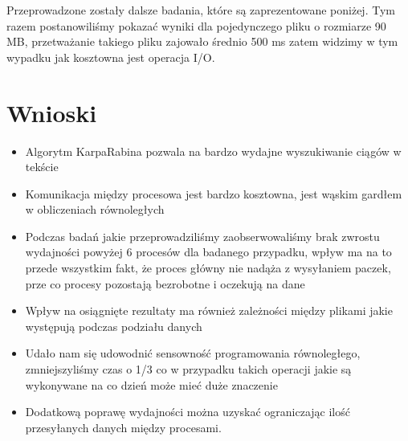 \documentclass[12pt,a4paper]{article}
\begin{document}
\newpage 
Przeprowadzone zostały dalsze badania, które są zaprezentowane poniżej. Tym razem postanowiliśmy pokazać wyniki dla pojedynczego pliku o rozmiarze 90 MB, przetważanie takiego pliku zajowało średnio 500 ms zatem widzimy w tym wypadku jak kosztowna jest operacja I/O.


\section*{Wnioski}

\begin{itemize}
\item Algorytm Karpa\-Rabina pozwala na bardzo wydajne wyszukiwanie ciągów w tekście
\item Komunikacja między procesowa jest bardzo kosztowna, jest wąskim gardłem w obliczeniach równoległych
\item Podczas badań jakie przeprowadziliśmy zaobserwowaliśmy brak zwrostu wydajności powyżej 6 procesów dla badanego przypadku, wpływ ma na to przede wszystkim fakt, że proces główny nie nadąża z wysyłaniem paczek, prze co procesy pozostają bezrobotne i oczekują na dane
\item Wpływ na osiągnięte rezultaty ma również zależności między plikami jakie występują podczas podziału danych
\item Udało nam się udowodnić sensowność programowania równoległego, zmniejszyliśmy czas o 1/3 co w przypadku takich operacji jakie są wykonywane na co dzień może mieć duże znaczenie
\item Dodatkową poprawę wydajności można uzyskać ograniczając ilość przesyłanych danych między procesami.
\end{itemize}
\end{document}
